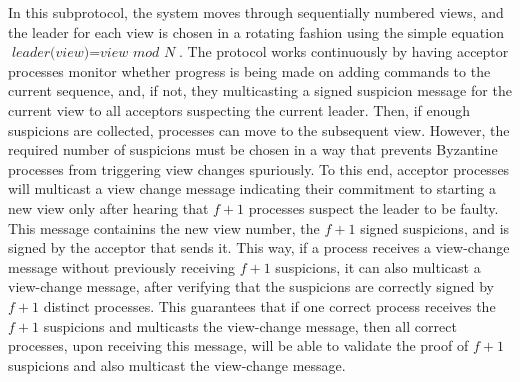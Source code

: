 In this subprotocol, the system moves through sequentially numbered views, and the leader for each view is chosen in a rotating fashion using the simple equation $\textit{leader(view)}=\textit{view mod N}$. The protocol works continuously by having acceptor processes monitor whether progress is being made on adding commands to the current sequence, and, if not, they multicasting a signed {\sc suspicion} message for the current view to all acceptors suspecting the current leader. Then, if enough suspicions are collected, processes can move to the subsequent view. However, the required number of suspicions must be chosen in a way that prevents Byzantine processes from triggering view changes spuriously. To this end, acceptor processes will multicast a view change message indicating their commitment to starting a new view only after hearing that $f+1$ processes suspect the leader to be faulty. This message containins the new view number, the $f+1$ signed suspicions, and is signed by the acceptor that sends it. This way, if a process receives a view-change message without previously receiving $f+1$ suspicions, it can also multicast a view-change message, after verifying that the suspicions are correctly signed by $f+1$ distinct processes.
This guarantees that if one correct process receives the $f+1$ suspicions and multicasts the view-change message, then all correct processes, upon receiving this message, will be able to validate the proof of $f+1$ suspicions and also multicast the view-change message.\par
